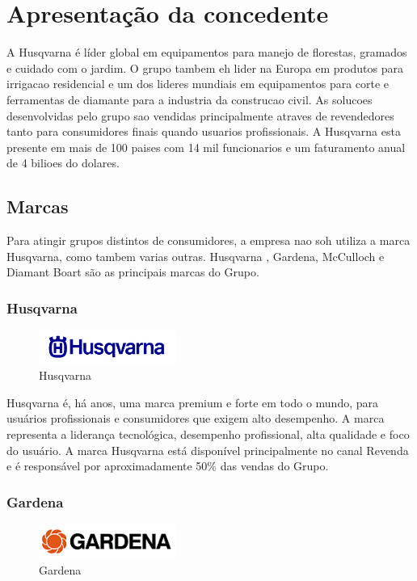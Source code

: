 \documentclass[12pt]{article}
\begin{document}
\section{Apresentação da concedente}

A Husqvarna é líder global em equipamentos para manejo de florestas, gramados e cuidado com o jardim. O grupo tambem eh lider na Europa em produtos para irrigacao residencial e um dos lideres mundiais em equipamentos para corte e ferramentas de diamante para a industria da construcao civil. As solucoes desenvolvidas pelo grupo sao vendidas principalmente atraves de revendedores tanto para consumidores finais quando usuarios profissionais. A Husqvarna esta presente em mais de 100 paises com 14 mil funcionarios e um faturamento anual de 4 bilioes do dolares.

\subsection{Marcas}
	Para atingir grupos distintos de consumidores, a empresa nao soh utiliza a marca Husqvarna, como tambem varias outras. Husqvarna , Gardena, McCulloch e Diamant Boart são as principais marcas do Grupo.

\subsubsection{Husqvarna}

\begin{figure}[h!]
	\centering
	\includegraphics[width=0.4\textwidth]{img/logo-husqvarna.png}
	\caption{Husqvarna}
\end{figure}

	Husqvarna é, há anos, uma marca premium e forte em todo o mundo, para usuários profissionais e consumidores que exigem alto desempenho. A marca representa a liderança tecnológica, desempenho profissional, alta qualidade e foco do usuário. A marca Husqvarna está disponível principalmente no canal Revenda e é responsável por aproximadamente 50\% das vendas do Grupo.

\subsubsection{Gardena}

\begin{figure}[h!]
	\centering
	\includegraphics[width=0.4\textwidth]{img/logo-gardena.png}
	\caption{Gardena}
\end{figure}
\end{document}
